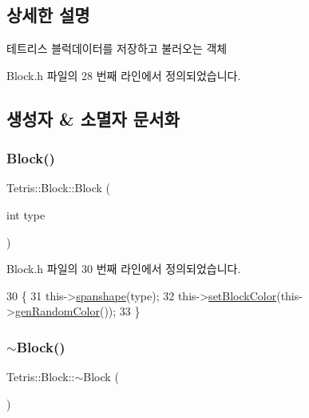 \subsection{상세한 설명}
테트리스 블럭데이터를 저장하고 불러오는 객체 

Block.\+h 파일의 28 번째 라인에서 정의되었습니다.



\subsection{생성자 \& 소멸자 문서화}
\mbox{\label{class_tetris_1_1_block_a1fd0aaff1f4b622c9c7027929c5d4534}} 
\subsubsection{\texorpdfstring{Block()}{Block()}\hspace{0.1cm}{\footnotesize\ttfamily [1/4]}}
{\footnotesize\ttfamily Tetris\+::\+Block\+::\+Block (\begin{DoxyParamCaption}\item[{int}]{type }\end{DoxyParamCaption})\hspace{0.3cm}{\ttfamily [inline]}}



Block.\+h 파일의 30 번째 라인에서 정의되었습니다.


\begin{DoxyCode}
30                        \{
31             this->\hyperlink{class_tetris_1_1_block_ad683f161157c16b80d5df8929bca468c}{spanshape}(type);
32             this->\hyperlink{class_tetris_1_1_block_a1a3fab9e7eabe64a4ba588ed5091d3a9}{setBlockColor}(this->\hyperlink{class_tetris_1_1_block_a4bae85cab786853cb3ff76aa7fe72edc}{genRandomColor}());
33         \}
\end{DoxyCode}
\mbox{\label{class_tetris_1_1_block_a20012167d55a996d56825d99082419c6}} 
\subsubsection{\texorpdfstring{$\sim$\+Block()}{~Block()}\hspace{0.1cm}{\footnotesize\ttfamily [1/2]}}
{\footnotesize\ttfamily Tetris\+::\+Block\+::$\sim$\+Block (\begin{DoxyParamCaption}{ }\end{DoxyParamCaption})\hspace{0.3cm}{\ttfamily [inline]}}



